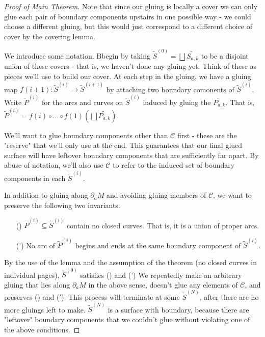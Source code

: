 \documentclass[12pt]{amsart}
\theoremstyle{definition}
\theoremstyle{remark}
\newcommand{\bd}{\partial}
\newcommand{\cin}{\subseteq}
\newcommand{\cC}{\mathcal{C}}
\begin{document}
\begin{proof}[Proof of Main Theorem]
Note that since our gluing is locally a cover we can only glue each pair of
boundary components upstairs in one possible way - we could choose a different
gluing, but this would just correspond to a different choice of cover by the
covering lemma.

We introduce some notation. Bbegin by taking $\widetilde{S}^{(0)} = \bigsqcup \widetilde{S_{a,k}}$ to
be a disjoint union of these covers - that is, we haven't done any gluing yet.
Think of these as pieces we'll use to build our cover. At each step in the
gluing, we have a gluing map $f(i+1) \colon \widetilde{S}^{(i)} \to
\widetilde{S}^{(i+1)}$ by attaching two boundary comonents of
$\widetilde{S}^{(i)}$. Write $\widetilde{P}^{(i)}$ for the arcs and curves on
$\widetilde{S}^{(i)}$ induced by gluing the $\widetilde{P_{a,k}}$.  That is,
$\widetilde{P}^{(i)} = f(i) \circ ...  \circ f(1) (\bigsqcup
\widetilde{P_{a,k}})$.

We'll want to glue boundary components other than $\cC$ first - these are the
"reserve" that we'll only use at the end. This guarantees that our final glued
surface will have leftover boundary components that are sufficiently far apart.
By abuse of notation, we'll also use $\cC$ to refer to the induced set of
boundary components in each $\widetilde{S}^{(i)}$.

In addition to gluing along $\bd_aM$ and avoiding gluing members of $\cC$, we want
to preserve the following two invariants.


\begin{enumerate}

\item[(\dag)] $\widetilde{P}^{(i)} \cin \widetilde{S}^{(i)}$ contain no closed
curves.  That is, it is a union of proper arcs. \label{I:dag}

\item[(\dag')] No arc of $\widetilde{P}^{(i)}$ begins and ends at the same
boundary component of $\widetilde{S}^{(i)}$. \label{I:dag'}

\end{enumerate}

By the use of the lemma and the assumption of the theorem (no closed curves in
individual pages), $\widetilde{S}^{(0)}$ satisfies (\dag) and (\dag') We
repeatedly make an arbitrary gluing that lies along $\bd_aM$ in the above
sense, doesn't glue any elements of $\cC$, and preserves (\dag) and (\dag').  This
process will terminate at some $\widetilde{S}^{(N)}$, after there are no more
gluings left to make. $\widetilde{S}^{(N)}$ is a surface with boundary, because
there are "leftover" boundary components that we couldn't glue without
violating one of the above conditions.


\end{proof}
\end{document}

